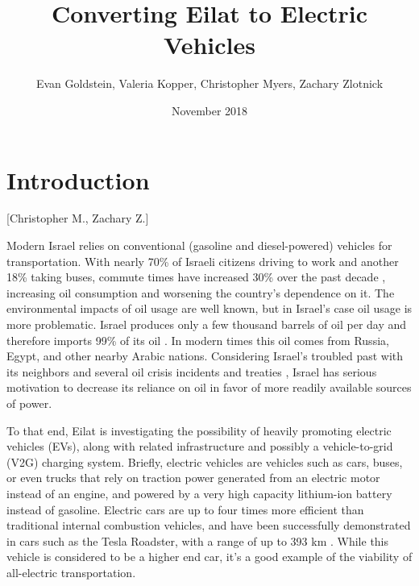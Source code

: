 \documentclass{article}                         %
\title{Converting Eilat to Electric Vehicles}
\author{Evan Goldstein, Valeria Kopper, Christopher Myers, Zachary Zlotnick}
\date{November 2018}
\begin{document}
\maketitle
\newpage

\renewcommand\abstractname{Summary} %

\tableofcontents
\newpage
\listofauthorships
\newpage
{}
\doublespacing

\section{Introduction}[Christopher M., Zachary Z.]

Modern Israel relies on conventional (gasoline and diesel-powered) vehicles for transportation. With nearly 70\% of Israeli citizens driving to work and another 18\% taking buses, commute times have increased 30\% over the past decade \cite{Dori2018IsraeliRoads}, increasing oil consumption and worsening the country's dependence on it. The environmental impacts of oil usage are well known, but in Israel's case oil usage is more problematic. Israel produces only a few thousand barrels of oil per day and therefore imports 99\% of its oil \cite{Engber2006WhereOil}. In modern times this oil comes from Russia, Egypt, and other nearby Arabic nations. Considering Israel's troubled past with its neighbors and several oil crisis incidents and treaties \cite{Engber2006WhereOil}, Israel has serious motivation to decrease its reliance on oil in favor of more readily available sources of power.

To that end, Eilat is investigating the possibility of heavily promoting electric vehicles (EVs), along with related infrastructure and possibly a vehicle-to-grid (V2G) charging system. Briefly, electric vehicles are vehicles such as cars, buses, or even trucks that rely on traction power generated from an electric motor instead of an engine, and powered by a very high capacity lithium-ion battery instead of gasoline. Electric cars are up to four times more efficient than traditional internal combustion vehicles, and have been successfully demonstrated in cars such as the Tesla Roadster, with a range of up to 393 km \cite{Friel2010ManagementVehicles}. While this vehicle is considered to be a higher end car, it's a good example of the viability of all-electric transportation.
\end{document}
